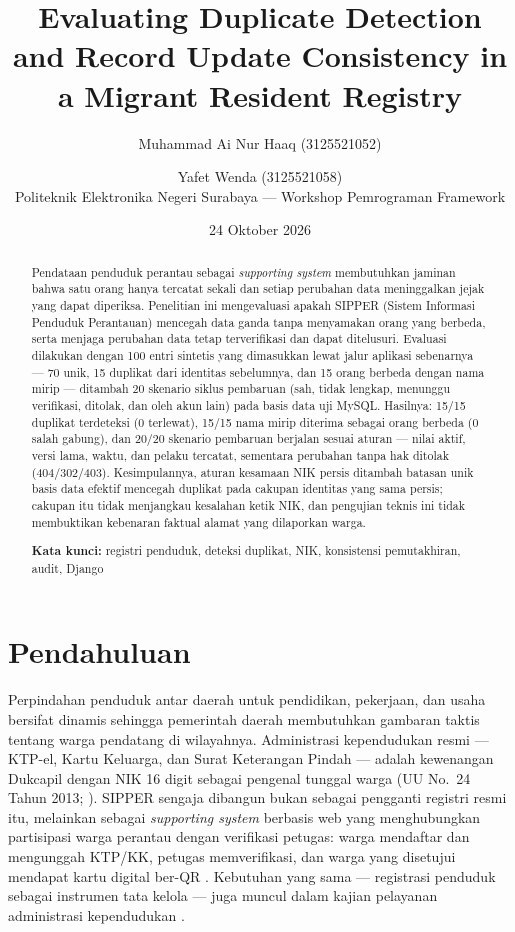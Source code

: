 \documentclass[11pt,a4paper]{article}
\title{\bfseries Evaluating Duplicate Detection and Record Update Consistency in a Migrant Resident Registry}
\author{Muhammad Ai Nur Haaq (3125521052) \and Yafet Wenda (3125521058)\\[0.5em]
Politeknik Elektronika Negeri Surabaya --- Workshop Pemrograman Framework}
\date{24 Oktober 2026}
\begin{document}
\maketitle

\begin{abstract}
\noindent Pendataan penduduk perantau sebagai \emph{supporting system} membutuhkan jaminan bahwa satu orang hanya tercatat sekali dan setiap perubahan data meninggalkan jejak yang dapat diperiksa. Penelitian ini mengevaluasi apakah SIPPER (Sistem Informasi Penduduk Perantauan) mencegah data ganda tanpa menyamakan orang yang berbeda, serta menjaga perubahan data tetap terverifikasi dan dapat ditelusuri. Evaluasi dilakukan dengan 100 entri sintetis yang dimasukkan lewat jalur aplikasi sebenarnya --- 70 unik, 15 duplikat dari identitas sebelumnya, dan 15 orang berbeda dengan nama mirip --- ditambah 20 skenario siklus pembaruan (sah, tidak lengkap, menunggu verifikasi, ditolak, dan oleh akun lain) pada basis data uji MySQL. Hasilnya: 15/15 duplikat terdeteksi (0 terlewat), 15/15 nama mirip diterima sebagai orang berbeda (0 salah gabung), dan 20/20 skenario pembaruan berjalan sesuai aturan --- nilai aktif, versi lama, waktu, dan pelaku tercatat, sementara perubahan tanpa hak ditolak (404/302/403). Kesimpulannya, aturan kesamaan NIK persis ditambah batasan unik basis data efektif mencegah duplikat pada cakupan identitas yang sama persis; cakupan itu tidak menjangkau kesalahan ketik NIK, dan pengujian teknis ini tidak membuktikan kebenaran faktual alamat yang dilaporkan warga.

\medskip
\noindent\textbf{Kata kunci:} registri penduduk, deteksi duplikat, NIK, konsistensi pemutakhiran, audit, Django
\end{abstract}

\section{Pendahuluan}

Perpindahan penduduk antar daerah untuk pendidikan, pekerjaan, dan usaha bersifat dinamis sehingga pemerintah daerah membutuhkan gambaran taktis tentang warga pendatang di wilayahnya. Administrasi kependudukan resmi --- KTP-el, Kartu Keluarga, dan Surat Keterangan Pindah --- adalah kewenangan Dukcapil dengan NIK 16 digit sebagai pengenal tunggal warga (UU No.~24 Tahun 2013; \cite{ssrn-nik}). SIPPER sengaja dibangun bukan sebagai pengganti registri resmi itu, melainkan sebagai \emph{supporting system} berbasis web yang menghubungkan partisipasi warga perantau dengan verifikasi petugas: warga mendaftar dan mengunggah KTP/KK, petugas memverifikasi, dan warga yang disetujui mendapat kartu digital ber-QR \cite{sipper-doc}. Kebutuhan yang sama --- registrasi penduduk sebagai instrumen tata kelola --- juga muncul dalam kajian pelayanan administrasi kependudukan \cite{ejecs}.
\end{document}
